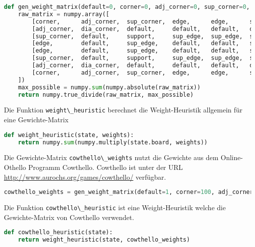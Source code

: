 \begin{lstlisting}[language=Python]
def gen_weight_matrix(default=0, corner=0, adj_corner=0, sup_corner=0, edge=0, dia_corner=0, support=0, sup_edge=0):
    raw_matrix = numpy.array([
        [corner,      adj_corner,  sup_corner,  edge,      edge,      sup_corner,  adj_corner,  corner],
        [adj_corner,  dia_corner,  default,     default,   default,   default,     dia_corner,  adj_corner],
        [sup_corner,  default,     support,     sup_edge,  sup_edge,  support,     default,     sup_corner],
        [edge,        default,     sup_edge,    default,   default,   sup_edge,    default,     edge],
        [edge,        default,     sup_edge,    default,   default,   sup_edge,    default,     edge],
        [sup_corner,  default,     support,     sup_edge,  sup_edge,  support,     default,     sup_corner],
        [adj_corner,  dia_corner,  default,     default,   default,   default,     dia_corner,  adj_corner],
        [corner,      adj_corner,  sup_corner,  edge,      edge,      sup_corner,  adj_corner,  corner]
    ])
    max_possible = numpy.sum(numpy.absolute(raw_matrix))
    return numpy.true_divide(raw_matrix, max_possible)
\end{lstlisting}

Die Funktion \passthrough{\lstinline!weight\_heuristic!} berechnet die
Weight-Heuristik allgemein für eine Gewichte-Matrix

\begin{lstlisting}[language=Python]
def weight_heuristic(state, weights):
    return numpy.sum(numpy.multiply(state.board, weights))
\end{lstlisting}

Die Gewichte-Matrix \passthrough{\lstinline!cowthello\_weights!} nutzt
die Gewichte aus dem Online-Othello Programm Cowthello. Cowthello ist
unter der URL \url{http://www.aurochs.org/games/cowthello/} verfügbar.

\begin{lstlisting}[language=Python]
cowthello_weights = gen_weight_matrix(default=1, corner=100, adj_corner=-25, sup_corner=25, edge=10, dia_corner=-50, support=50, sup_edge=5)
\end{lstlisting}

Die Funktion \passthrough{\lstinline!cowthello\_heuristic!} ist eine
Weight-Heuristik welche die Gewichte-Matrix von Cowthello verwendet.

\begin{lstlisting}[language=Python]
def cowthello_heuristic(state):
    return weight_heuristic(state, cowthello_weights)
\end{lstlisting}


